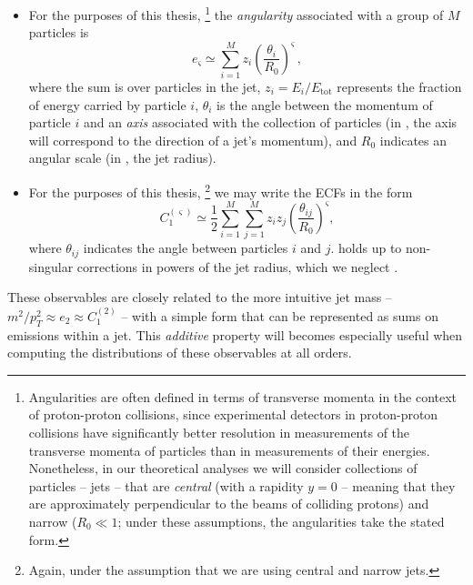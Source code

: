 \begin{itemize}
    \item

    For the purposes of this thesis,%
    \footnote{
        Angularities are often defined in terms of transverse momenta in the context of proton-proton collisions, since experimental detectors in proton-proton collisions have significantly better resolution in measurements of the transverse momenta of particles than in measurements of their energies.
        Nonetheless, in our theoretical analyses we will consider collections of particles -- jets -- that are \emph{central} (with a rapidity \(y = 0\) -- meaning that they are approximately perpendicular to the beams of colliding protons) and narrow (\(R_0 \ll 1\);
        under these assumptions, the angularities take the stated form.
    }
    the \emph{angularity} associated with a group of \(M\) particles is
    \begin{equation}
        e_{\varsigma}
        \simeq
        \sum_{i=1}^M
        z_i \left(\frac{\theta_{i}}{R_0}\right)^\varsigma
        \label{eq:angularitydefn_lo}
        \,,
    \end{equation}
    where the sum is over particles in the jet, \(z_i = E_i / E_\text{tot}\) represents the fraction of energy carried by particle \(i\), \(\theta_i\) is the angle between the momentum of particle \(i\) and an \textit{axis} associated with the collection of particles (in , the axis will correspond to the direction of a jet's momentum), and \(R_0\) indicates an angular scale (in , the jet radius).

    \item

    For the purposes of this thesis,%
    \footnote{Again, under the assumption that we are using central and narrow jets.}
    we may write the ECFs in the form
    \begin{equation}
        C_1^{(\varsigma)}
        \simeq
        \frac{1}{2}\sum_{i=1}^M\sum_{j=1}^M
        z_i z_j \left(\frac{\theta_{ij}}{R_0}\right)^\varsigma
        \label{eq:GECFdefn_lo}
        ,
    \end{equation}
    where \(\theta_{ij}\) indicates the angle between particles \(i\) and \(j\).
     holds up to non-singular corrections in powers of the jet radius, which we neglect \cite{Larkoski:2014wba}.
\end{itemize}
%
These observables are closely related to the more intuitive jet mass -- \(m^2 / p_T^2 \approx e_2 \approx C_1^{(2)}\) -- with a simple form that can be represented as sums on emissions within a jet.
%
This \textit{additive} property will becomes especially useful when computing the distributions of these observables at all orders.

